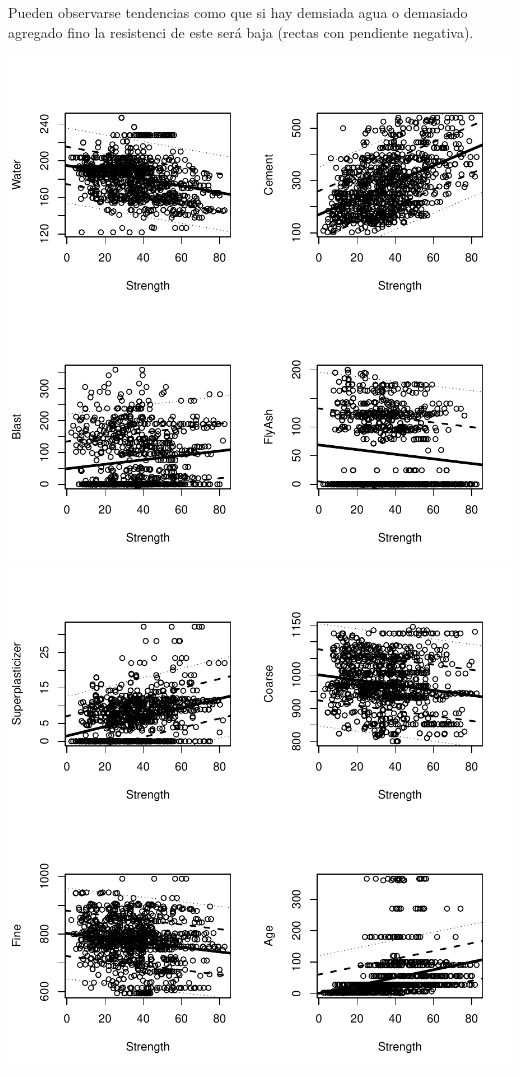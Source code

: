 \documentclass [a4paper] {article}
\begin{document}
Pueden observarse tendencias como que si hay demsiada agua o demasiado agregado fino la resistenci de este será baja (rectas con pendiente negativa).
\begin{center}
\includegraphics{entrega-analisis_concrete_plot_1}
\includegraphics{entrega-analisis_concrete_plot_2}
\end{center}
\end{document}
